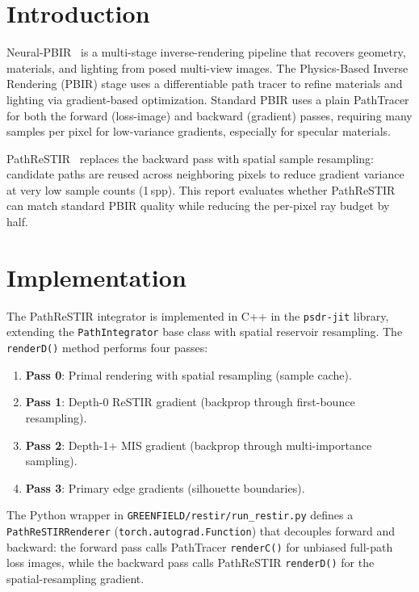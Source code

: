 
\section{Introduction}

Neural-PBIR~\cite{neuralpbir2024} is a multi-stage inverse-rendering pipeline
that recovers geometry, materials, and lighting from posed multi-view images.
The Physics-Based Inverse Rendering (PBIR) stage uses a differentiable path
tracer to refine materials and lighting via gradient-based optimization. Standard
PBIR uses a plain PathTracer for both the forward (loss-image) and backward
(gradient) passes, requiring many samples per pixel for low-variance gradients,
especially for specular materials.

PathReSTIR~\cite{restir2020} replaces the backward pass with spatial sample
resampling: candidate paths are reused across neighboring pixels to reduce
gradient variance at very low sample counts (1\,spp). This report evaluates
whether PathReSTIR can match standard PBIR quality while reducing the per-pixel
ray budget by half.

\section{Implementation}

The PathReSTIR integrator is implemented in C++ in the \texttt{psdr-jit}
library, extending the \texttt{PathIntegrator} base class with spatial reservoir
resampling. The \texttt{renderD()} method performs four passes:

\begin{enumerate}
    \item \textbf{Pass 0}: Primal rendering with spatial resampling (sample cache).
    \item \textbf{Pass 1}: Depth-0 ReSTIR gradient (backprop through first-bounce resampling).
    \item \textbf{Pass 2}: Depth-1+ MIS gradient (backprop through multi-importance sampling).
    \item \textbf{Pass 3}: Primary edge gradients (silhouette boundaries).
\end{enumerate}

The Python wrapper in \texttt{GREENFIELD/restir/run\_restir.py} defines a
\texttt{PathReSTIRRenderer} (\texttt{torch.autograd.Function}) that decouples
forward and backward: the forward pass calls PathTracer \texttt{renderC()} for
unbiased full-path loss images, while the backward pass calls PathReSTIR
\texttt{renderD()} for the spatial-resampling gradient.

